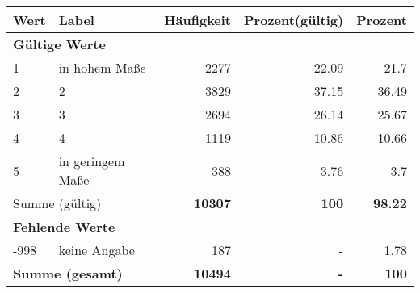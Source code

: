      \begin{longtable}{lXrrr}
     \toprule
     \textbf{Wert} & \textbf{Label} & \textbf{Häufigkeit} & \textbf{Prozent(gültig)} & \textbf{Prozent} \\
     \endhead
     \midrule
     \multicolumn{5}{l}{\textbf{Gültige Werte}}\\

     1 &
     \multicolumn{1}{X}{ in hohem Maße   } &


       \num{2277} &
       \num[round-mode=places,round-precision=2]{22,09} &
         \num[round-mode=places,round-precision=2]{21,7} \\

     2 &
     \multicolumn{1}{X}{ 2   } &


       \num{3829} &
       \num[round-mode=places,round-precision=2]{37,15} &
         \num[round-mode=places,round-precision=2]{36,49} \\

     3 &
     \multicolumn{1}{X}{ 3   } &


       \num{2694} &
       \num[round-mode=places,round-precision=2]{26,14} &
         \num[round-mode=places,round-precision=2]{25,67} \\

     4 &
     \multicolumn{1}{X}{ 4   } &


       \num{1119} &
       \num[round-mode=places,round-precision=2]{10,86} &
         \num[round-mode=places,round-precision=2]{10,66} \\

     5 &
     \multicolumn{1}{X}{ in geringem Maße   } &


       \num{388} &
       \num[round-mode=places,round-precision=2]{3,76} &
         \num[round-mode=places,round-precision=2]{3,7} \\
     \midrule
     \multicolumn{2}{l}{Summe (gültig)} &
       \textbf{\num{10307}} &
     \textbf{100} &
       \textbf{\num[round-mode=places,round-precision=2]{98,22}} \\
     \multicolumn{5}{l}{\textbf{Fehlende Werte}}\\
       -998 &
       keine Angabe &
         \num{187} &
        - &
         \num[round-mode=places,round-precision=2]{1,78} \\
     \midrule
     \multicolumn{2}{l}{\textbf{Summe (gesamt)}} &
          \textbf{\num{10494}} &
        \textbf{-} &
        \textbf{100} \\
     \bottomrule
     \end{longtable}
     
